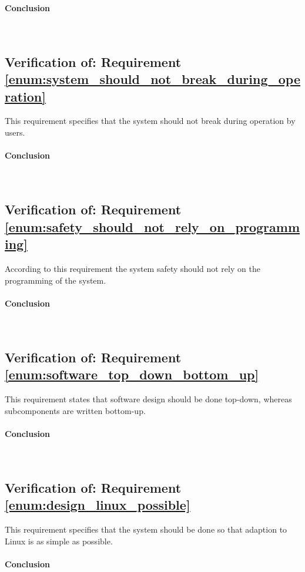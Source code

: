 \paragraph{Conclusion}~\\


\subsection{Verification of: Requirement \ref{enum:system_should_not_break_during_operation}} %
\label{sub:verification_of_requirement_enum:system_should_not_break_during_operation}
This requirement specifies that the system should not break during operation by users.

\paragraph{Conclusion}~\\

\subsection{Verification of: Requirement \ref{enum:safety_should_not_rely_on_programming}} %
\label{sub:verification_of_requirement_enum:safety_should_not_rely_on_programming}
According to this requirement the system safety should not rely on the programming of the system.

\paragraph{Conclusion}~\\

\subsection{Verification of: Requirement \ref{enum:software_top_down_bottom_up}} %
\label{sub:verification_of_requirement_enum:software_top_down_bottom_up}
This requirement states that software design should be done top-down, whereas subcomponents are written bottom-up.

\paragraph{Conclusion}~\\


\subsection{Verification of: Requirement \ref{enum:design_linux_possible}} %
\label{sub:verification_of_requirement_enum:design_linux_possible}
This requirement specifies that the system should be done so that adaption to Linux is as simple as possible.

\paragraph{Conclusion}~\\
